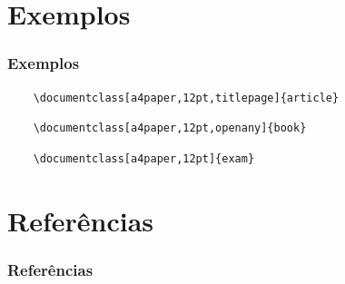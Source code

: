 \documentclass{beamer}
\begin{document}
\section{Exemplos}

\begin{frame}[fragile]
    \frametitle{Exemplos}
\begin{lstlisting}
    \documentclass[a4paper,12pt,titlepage]{article}
\end{lstlisting}
\begin{lstlisting}
    \documentclass[a4paper,12pt,openany]{book}
\end{lstlisting}
\begin{lstlisting}
    \documentclass[a4paper,12pt]{exam}
\end{lstlisting}

\end{frame}

\section{Referências}
\begin{frame}
    \frametitle{Referências}
    \nocite{WikibooksLatex,BeamerDocumentation,ExamDocumentation,latex24h}
    \printbibliography[]

\end{frame}
\end{document}
